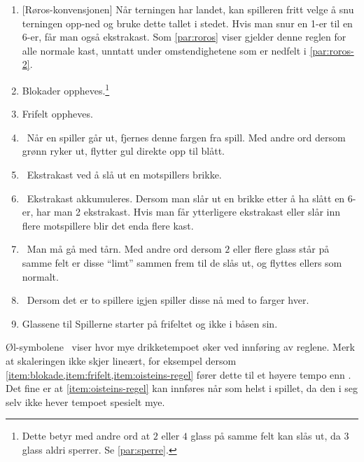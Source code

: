 \documentclass[10pt,a4paper,norsk,openany]{book}
\begin{document}
\begin{enumerate}
  \item\phantom{.}[Røros-konvensjonen] Når terningen har landet, kan
    spilleren fritt velge å snu terningen opp-ned og bruke dette tallet i
    stedet. Hvis man snur en 1-er til en 6-er, får man også ekstrakast. Som
    \cref{par:roros} viser gjelder denne reglen for alle normale kast, unntatt
    under omstendighetene som er nedfelt i \cref{par:roros-2}.

  \item \faBeer \label{item:blokade} Blokader oppheves.\footnote{Dette betyr med
    andre ord at $2$ eller $4$ glass på samme felt kan slås ut, da $3$ glass
    aldri sperrer. Se \cref{par:sperre}.}

  \item \faBeer \label{item:frifelt} Frifelt oppheves.

  \item \faBeer \ Når en spiller går ut, fjernes denne fargen fra spill. Med
    andre ord dersom grønn ryker ut, flytter gul direkte opp til blått. 

  \item \faBeer \faBeer \ Ekstrakast ved å slå ut en motspillers brikke.

  \item \faBeer \faBeer \ Ekstrakast akkumuleres. Dersom man slår ut en brikke
    etter å ha slått en 6-er, har man 2 ekstrakast. Hvis man får ytterligere
    ekstrakast eller slår inn flere motspillere blir det enda flere kast.

  \item \faBeer \faBeer \ Man må gå med tårn. Med andre ord dersom $2$ eller
    flere glass står på samme felt er disse ``limt'' sammen frem til de slås ut,
    og flyttes ellers som normalt. 

  \item \faBeer \faBeer \faBeer \ Dersom det er to spillere igjen spiller disse
    nå med to farger hver.

  \item \faBeer \faBeer \label{item:oisteins-regel} Glassene til Spillerne
    starter på frifeltet og ikke i båsen sin.
\end{enumerate}

Øl-symbolene \faBeer\ viser hvor mye drikketempoet øker ved innføring av reglene.
Merk at skaleringen ikke skjer lineært, for eksempel dersom
\cref{item:blokade,item:frifelt,item:oisteins-regel} fører dette til et høyere tempo
enn \faBeer\faBeer\faBeer\faBeer. Det fine er at \cref{item:oisteins-regel} kan
innføres når som helst i spillet, da den i seg selv ikke hever tempoet spesielt mye.
\end{document}
